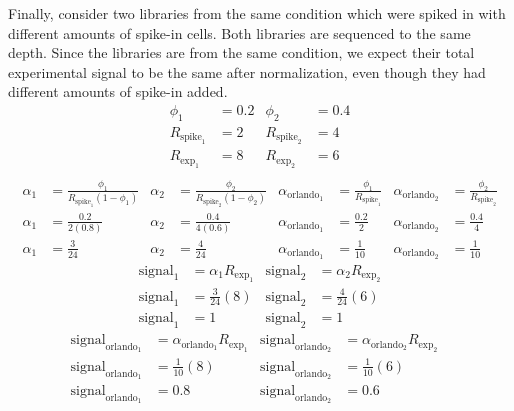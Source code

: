 Finally, consider two libraries from the same condition which were spiked in with different amounts of spike-in cells.
Both libraries are sequenced to the same depth.
Since the libraries are from the same condition, we expect their total experimental signal to be the same after normalization, even though they had different amounts of spike-in added.
\begin{align*}
    \phi_1 &= 0.2 & \phi_2 &=0.4 \\
    R_{\text{spike}_1} &= 2 & R_{\text{spike}_2} &= 4 \\
    R_{\text{exp}_1} &= 8 & R_{\text{exp}_2} &= 6 \\
\end{align*}
\begin{align*}
    \alpha_1 &= \frac{\phi_1}{R_{\text{spike}_1} \left(1-\phi_1 \right)} &
    \alpha_2 &= \frac{\phi_2}{R_{\text{spike}_2} \left(1-\phi_2 \right)} &
    \alpha_{\text{orlando}_1} &= \frac{\phi_1}{R_{\text{spike}_1}} &
    \alpha_{\text{orlando}_2} &= \frac{\phi_2}{R_{\text{spike}_2}} \\
    \alpha_1 &= \frac{0.2}{2 \left(0.8 \right)} &
    \alpha_2 &= \frac{0.4}{4 \left(0.6 \right)} &
    \alpha_{\text{orlando}_1} &= \frac{0.2}{2} &
    \alpha_{\text{orlando}_2} &= \frac{0.4}{4} \\
    \alpha_1 &= \frac{3}{24} &
    \alpha_2 &= \frac{4}{24} &
    \alpha_{\text{orlando}_1} &= \frac{1}{10} &
    \alpha_{\text{orlando}_2} &= \frac{1}{10}
\end{align*}
\begin{align*}
    \text{signal}_1 &= \alpha_1 R_{\text{exp}_1}  &
    \text{signal}_2 &= \alpha_2 R_{\text{exp}_2}  \\
    \text{signal}_1 &=  \frac{3}{24} \left(8 \right)  &
    \text{signal}_2 &=  \frac{4}{24} \left(6 \right)  \\
    \text{signal}_1 &=  1 &
    \text{signal}_2 &=  1
\end{align*}
\begin{align*}
    \text{signal}_{\text{orlando}_1} &= \alpha_{\text{orlando}_1} R_{\text{exp}_1} &
    \text{signal}_{\text{orlando}_2} &= \alpha_{\text{orlando}_2} R_{\text{exp}_2} & \\
    \text{signal}_{\text{orlando}_1} &= \frac{1}{10} \left(8\right) &
    \text{signal}_{\text{orlando}_2} &= \frac{1}{10} \left(6\right) & \\
    \text{signal}_{\text{orlando}_1} &= 0.8 &
    \text{signal}_{\text{orlando}_2} &= 0.6
\end{align*}
